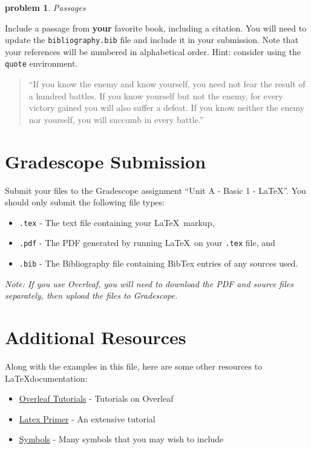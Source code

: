 \documentclass[10pt]{article}
\newtheorem{problem}{\sc\color{cit}problem}
\begin{document}
\begin{problem} Passages \end{problem}
    Include a passage from \textbf{your} favorite book, including a citation.  You will need to update the \verb|bibliography.bib| file and include it in your submission. Note that your references will be numbered in alphabetical order.  Hint: consider using the \verb|quote| environment.

\begin{quote}
    “If you know the enemy and know yourself, you need not fear the result of a hundred battles. If you know yourself but not the enemy, for every victory gained you will also suffer a defeat. If you know neither the enemy nor yourself, you will succumb in every battle.” ~\cite{Tzu}
\end{quote}




\section*{Gradescope Submission}
Submit your files to the Gradescope assignment ``Unit A - Basic 1 - LaTeX''.  You should only submit the following file types:
\begin{itemize}
    \item \verb|.tex| - The text file containing your \LaTeX~markup,
    \item \verb|.pdf| - The PDF generated by running \LaTeX~on your \verb|.tex| file, and
    \item \verb|.bib| - The Bibliography file containing BibTex entries of any sources used.
\end{itemize}
\textit{Note: If you use Overleaf, you will need to download the PDF and source files separately, then upload the files to Gradescope.}

\section*{Additional Resources}

Along with the examples in this file, here are some other resources to \LaTeX documentation:

\begin{itemize}
    \item \href{https://www.overleaf.com/learn/latex/Tutorials}{Overleaf Tutorials} - Tutorials on Overleaf
    \item \href{https://www.maths.tcd.ie/~dwilkins/LaTeXPrimer/}{Latex Primer} - An extensive tutorial
    \item \href{http://www.cs.put.poznan.pl/ksiek/latexmath.html#set-theory}{Symbols} - Many symbols that you may wish to include
\end{itemize}



\end{document}
